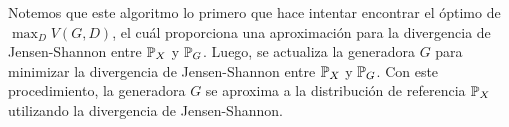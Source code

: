 {{{\begin{remark}
    Notemos que este algoritmo lo primero que hace intentar encontrar el óptimo de $\max_D V(G, D)$, el cuál proporciona una aproximación para la divergencia de Jensen-Shannon entre $\Prob_X$ y $\Prob_G$. Luego, se actualiza la generadora $G$ para minimizar la divergencia de Jensen-Shannon entre $\Prob_X$ y $\Prob_G$. Con este procedimiento, la generadora $G$ se aproxima a la distribución de referencia $\Prob_X$ utilizando la divergencia de Jensen-Shannon.
\end{remark}













}  %



}  %
}  %